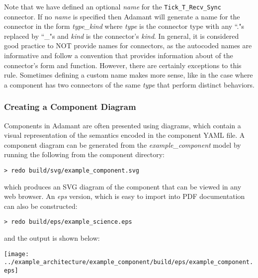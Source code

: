 Note that we have defined an optional \textit{name} for the \texttt{Tick\_T\_Recv\_Sync} connector. If no \textit{name} is specified then Adamant will generate a name for the connector in the form \textit{type\_kind} where \textit{type} is the connector type with any ``."s replaced by ``\_"s and \textit{kind} is the connector's \textit{kind}. In general, it is considered good practice to NOT provide names for connectors, as the autocoded names are informative and follow a convention that provides information about of the connector's form and function. However, there are certainly exceptions to this rule. Sometimes defining a custom name makes more sense, like in the case where a component has two connectors of the same \textit{type} that perform distinct behaviors. \\

\subsubsection{Creating a Component Diagram} \label{Creating a Component Diagram}

Components in Adamant are often presented using diagrams, which contain a visual representation of the semantics encoded in the component YAML file. A component diagram can be generated from the \textit{example\_component} model by running the following from the component directory:

\vspace{5mm} %
\begin{verbatim}
> redo build/svg/example_component.svg
\end{verbatim}
\vspace{5mm} %

which produces an SVG diagram of the component that can be viewed in any web browser. An \textit{eps} version, which is easy to import into PDF documentation can also be constructed:

\vspace{5mm} %
\begin{verbatim}
> redo build/eps/example_science.eps
\end{verbatim}
\vspace{5mm} %

and the output is shown below:

\vspace{5mm} %
\texttt{[image: ../example\_architecture/example\_component/build/eps/example\_component.eps]}
\vspace{5mm} %

